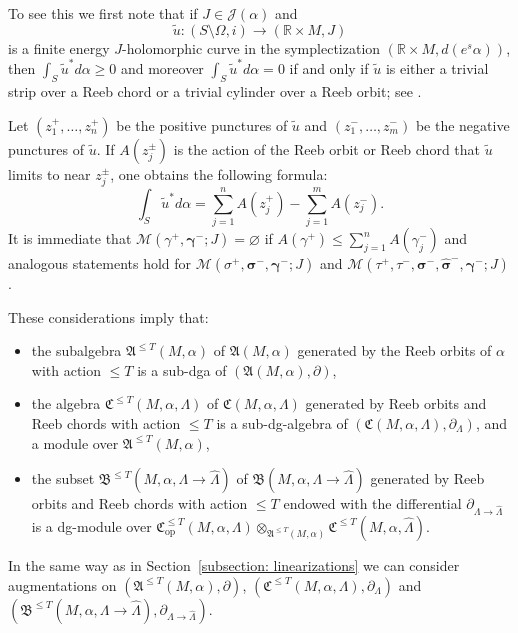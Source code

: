 \documentclass[JEP,XML,SOM,Unicode,NoFloatCountersInSection]{cedram}
\let\mathcal\mathscr
\let\ra\rightarrow
\newcommand{\opp}{\mathrm{op}}
\theoremstyle{plain}
\theoremstyle{definition}
\numberwithin{equation}{subsection}
\newcommand{\bdry}{\partial}
\let\bs\boldsymbol
\begin{document}
To see this we first note that if $J\in \mathcal{J}(\alpha)$ and
$$\widetilde{u}: (S\setminus \Omega,i) \to (\mathbb{R}\times M,J)$$
is a finite energy $J$-holomorphic curve in the symplectization $(\mathbb{R}\times M,d (e^s\alpha))$, then $\int_{S} \widetilde{u}^* d\alpha \geq 0$ and moreover $\int_{S} \widetilde{u}^* d\alpha=0$ if and only if $\widetilde{u}$ is either a trivial strip over a Reeb chord or a trivial cylinder over a Reeb orbit; see \cite{Ab,H}.

Let $(z^+_1,\dots,z^+_n)$ be the positive punctures of $\widetilde{u}$ and $(z^-_1,\dots,z^-_m)$ be the negative punctures of $\widetilde{u}$. If $A(z^{\pm}_j)$ is the action of the Reeb orbit or Reeb chord that $\widetilde{u}$ limits to near $z^{\pm}_j$, one obtains the following formula:
\begin{equation}
\int_{S} \widetilde{u}^* d\alpha = \sum_{j=1}^{n}A(z^{+}_j) - \sum_{j=1}^{m}A(z^{-}_j).
\end{equation}
It is immediate that $\mathcal{M}(\gamma^+,\bs\gamma^-;J)=\varnothing$ if $A(\gamma^+) \leq \sum_{j=1}^{n} A(\gamma^-_j) $ and analogous statements hold for ${\mathcal{M}}(\sigma^+,\bs\sigma^-,\bs\gamma^-;J)$ and ${\mathcal{M}}(\tau^+,\tau^-,\bs\sigma^-,\widehat{\bs\sigma}^-,\bs\gamma^-;J)$.

These considerations imply that:
\begin{itemize}
\item the subalgebra $\mathfrak{A}^{\leq T}(M,\alpha)$ of $\mathfrak{A}(M,\alpha)$ generated by the Reeb orbits of $\alpha$ with action $\leq T$ is a sub-dga of $(\mathfrak{A}(M,\alpha),\bdry)$,
\item the algebra $\mathfrak{C}^{\leq T}(M,\alpha,\Lambda)$ of $\mathfrak{C}(M,\alpha,\Lambda)$ generated by Reeb orbits and Reeb chords with action $\leq T$ is a sub-dg-algebra of $(\mathfrak{C}(M,\alpha,\Lambda),\partial_{\Lambda})$, and a module over $\mathfrak{A}^{\leq T}(M,\alpha)$,
\item the subset $\mathfrak{B}^{\leq T}(M,\alpha,\Lambda\ra \widehat{\Lambda})$ of $\mathfrak{B}(M,\alpha,\Lambda\ra \widehat{\Lambda})$ generated by Reeb orbits and Reeb chords with action $\leq T$ endowed with the differential $\partial_{\Lambda\ra \widehat{\Lambda}}$ is a dg-module over $\mathfrak{C}_{\opp}^{\leq T}(M,\alpha,\Lambda) \otimes_{\mathfrak{A}^{\leq T}(M,\alpha)} \mathfrak{C}^{\leq T}(M,\alpha,\widehat{\Lambda})$.
\end{itemize}

In the same way as in Section~\ref{subsection: linearizations} we can consider augmentations on $(\mathfrak{A}^{\leq T}(M,\alpha),\bdry)$, $(\mathfrak{C}^{\leq T}(M,\alpha,\Lambda),\partial_{\Lambda})$ and $(\mathfrak{B}^{\leq T}(M,\alpha,\Lambda\ra \widehat{\Lambda}),\partial_{\Lambda\ra \widehat{\Lambda}})$.
\end{document}
